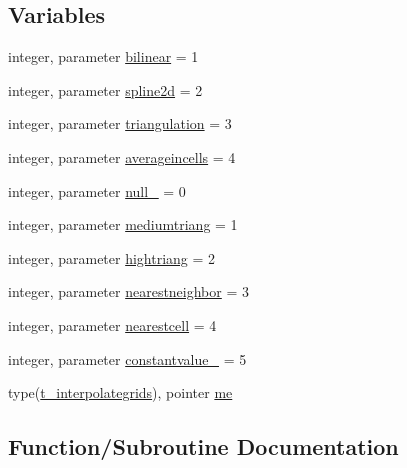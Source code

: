 \subsection*{Variables}
\begin{DoxyCompactItemize}
\item 
integer, parameter \mbox{\hyperlink{namespacemoduleinterpolategrids_ac8341ddae5bb639408912384ff746df5}{bilinear}} = 1
\item 
integer, parameter \mbox{\hyperlink{namespacemoduleinterpolategrids_a681a3b341faceff9996c4dd9cb253955}{spline2d}} = 2
\item 
integer, parameter \mbox{\hyperlink{namespacemoduleinterpolategrids_a54eaef7676acaf847ecb309033093046}{triangulation}} = 3
\item 
integer, parameter \mbox{\hyperlink{namespacemoduleinterpolategrids_a9beae6792d58f611c7648e4e715951f8}{averageincells}} = 4
\item 
integer, parameter \mbox{\hyperlink{namespacemoduleinterpolategrids_ac7780eea9b7811779df370a3ac901839}{null\+\_\+}} = 0
\item 
integer, parameter \mbox{\hyperlink{namespacemoduleinterpolategrids_a9f3037cf7605db0775ef6c7ed80f3629}{mediumtriang}} = 1
\item 
integer, parameter \mbox{\hyperlink{namespacemoduleinterpolategrids_adbfa0fd2fc99081cf59c07846b496309}{hightriang}} = 2
\item 
integer, parameter \mbox{\hyperlink{namespacemoduleinterpolategrids_afa5b41783be14839941a78db8aaed8f8}{nearestneighbor}} = 3
\item 
integer, parameter \mbox{\hyperlink{namespacemoduleinterpolategrids_a04cc7157f4bcb1187e20178dcbec08d6}{nearestcell}} = 4
\item 
integer, parameter \mbox{\hyperlink{namespacemoduleinterpolategrids_aa6629e5e5c7722feeeb9bd4d9c195aff}{constantvalue\+\_\+}} = 5
\item 
type(\mbox{\hyperlink{structmoduleinterpolategrids_1_1t__interpolategrids}{t\+\_\+interpolategrids}}), pointer \mbox{\hyperlink{namespacemoduleinterpolategrids_a4c871b123670d460c1cb96f90f4bf4d6}{me}}
\end{DoxyCompactItemize}


\subsection{Function/\+Subroutine Documentation}
\mbox{\label{namespacemoduleinterpolategrids_a74dfc196d632c6152816d265fcced032}} 
